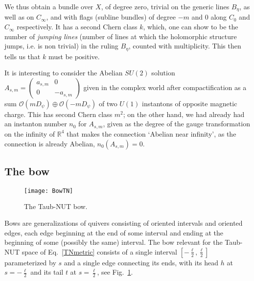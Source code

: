 \documentclass[12pt]{article}
\theoremstyle{definition}
\theoremstyle{remark}
\numberwithin{theorem}{section}
\def\bR{{\mathbb {R}}}
\def\pO{{\mathcal O}}
\begin{document}
We thus obtain a bundle over $X$, of degree zero, trivial on the generic lines $B_\eta$, as well as on $C_\infty$, and with flags (subline bundles) of degree $-m$ and $0$ along $C_0$ and  $C_\infty$ respectively. It has  a second Chern class $k$, which, one can show to be  the number of {\it jumping lines} (number of lines at which the holomorphic structure jumps, i.e. is non trivial) in the ruling $B_\eta$, counted with multiplicity. This then tells us that $k$ must be positive.

It is interesting to consider the Abelian $SU(2)$ solution 
$A_{s,m}=\left(\begin{smallmatrix}
a_{s,m}&0\\
0&-a_{s,m}
\end{smallmatrix}\right)
$ 
given in the complex world after compactification as a sum $\pO(mD_\psi)\oplus \pO(-mD_\psi)$ of two $U(1)$ instantons of opposite magnetic charge. This has second Chern class $m^2$; on the other hand, we had already had an instanton number  $n_0$ for $A_{s,m}$, given as   the  degree of the gauge transformation on the infinity of $\bR^4$ that  makes the connection `Abelian near infinity', as the connection is already Abelian,  $n_0(A_{s,m})= 0$.   
 
 \subsection{The bow}
    \begin{figure}[htb]
\begin{center}
    \texttt{[image: BowTN]}
\caption{The Taub-NUT bow.}
\label{Fig:BowTN}
\end{center}
\end{figure}  
 Bows are generalizations of quivers \cite{Cherkis:2008ip} consisting of oriented intervals and oriented edges, each edge beginning at the end of some interval and ending at the beginning of some (possibly the same) interval. The bow 
relevant for the Taub-NUT space of Eq.~\eqref{TNmetric} consists of a single interval $\left[-\frac{\ell}{2},\frac{\ell}{2}\right]$ parameterized by $s$ and a single edge connecting its ends, with its head $h$ at $s=-\frac{\ell}{2}$ and its tail $t$ at $s=\frac{\ell}{2}$, see Fig.~\ref{Fig:BowTN}.
\end{document}
